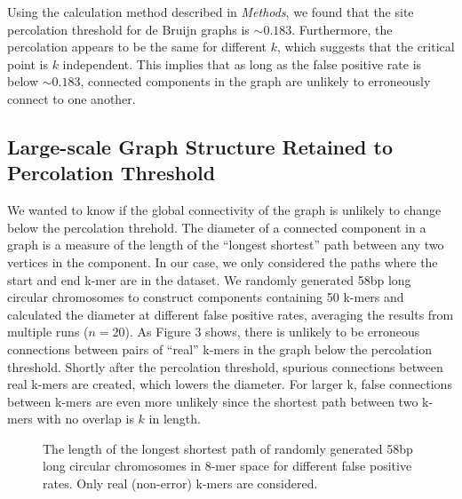\documentclass[12pt]{article} \usepackage{simplemargins}
\begin{document}
Using the calculation method described in \emph{Methods}, we found that the 
site percolation threshold for de Bruijn graphs is $\sim0.183$. 
Furthermore, the percolation appears to be the same for 
different $k$, which suggests that the 
critical point is $k$ independent. This implies that as long as the 
false positive rate is below $\sim 0.183$, connected components in the graph 
are unlikely to erroneously connect to one another.

\subsection{Large-scale Graph Structure Retained to Percolation Threshold}
We wanted to know if the global connectivity of the graph is unlikely 
to change below the percolation threhold. 
The diameter of a connected component in a graph is a measure of 
the length of the ``longest shortest'' 
path between any two vertices in the component. 
In our case, we only considered the
paths where the start and end k-mer are in the dataset. 
We randomly generated 58bp long circular
chromosomes to construct components containing 50 k-mers and 
calculated the diameter at different false positive rates, averaging
the results from multiple runs ($n=20$).
As Figure 3 shows, 
there is unlikely to 
be erroneous connections between pairs of ``real'' k-mers in the graph below the 
percolation threshold. Shortly after the percolation threshold, spurious connections 
between real k-mers are created, which lowers the diameter. For larger k, false connections 
between k-mers are even more unlikely since the shortest path between two k-mers 
with no overlap is $k$ in length.

\begin{figure}
\caption{The length of the longest shortest path of randomly generated 58bp 
long circular chromosomes in 8-mer 
space for different false positive rates. Only real (non-error) k-mers are 
considered.}
\end{figure}
\end{document}
